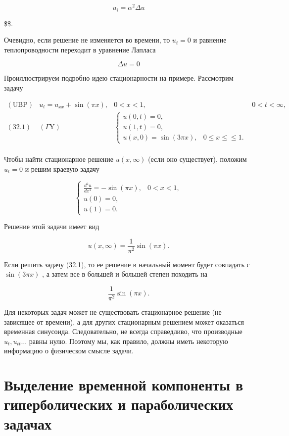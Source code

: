 \documentclass[
  ukrainian,
]{article}
\begin{document}
\[
u_i = \alpha^2 \Delta u
\]

\$\$.

Очевидно, если решение не изменяется во времени, то \(u_t = 0\) и
равнение теплопроводности переходит в уравнение Лапласа

\[
\Delta u = 0
\]

Проиллюстрируем подробно идею стационарности на примере. Рассмотрим
задачу

\[
\begin{array}{ll} (\text{UBP}) & u_t = u_{xx} + \sin{(\pi x)}, & 0 < x < 1, & 0 < t < \infty, \\ (32.1) & (\Gamma \text{Y}) & \begin{cases} u(0, t) = 0, \\ u(1, t) = 0, \\ u(x, 0) = \sin{(3\pi x)}, & 0 \le x \le \le 1. \end{cases} \\ \end{array}
\]

Чтобы найти стационарное решение \(u\left(x,\infty\right)\) (если оно
существует), положим \(u_{t}\!=\!0\) и решим краевую задачу

\[
\begin{cases} \frac{d^{2}u}{dx^{2}} = -\sin(\pi x), & 0 < x < 1, \\ u(0) = 0, \\ u(1) = 0. \end{cases}
\]

Решение этой задачи имеет вид

\[
u(x, \infty) = \frac{1}{\pi^2} \sin{(\pi x)}.
\]

Если решить задачу (32.1), то ее решение в начальный момент будет
совпадать с \(\sin{(3\pi x)}\) , а затем все в большей и большей степен
походить на

\[
\frac{1}{\pi^2}\sin{(\pi x)}.
\]

Для некоторых задач может не существовать стационарное решение (не
зависящее от времени), а для других стационарным решением может
оказаться временная синусоида. Следовательно, не всегда справедливо, что
производные \(u_t, u_{tt} \dots\) равны нулю. Поэтому мы, как правило,
должны иметь некоторую информацию о физическом смысле задачи.

\section{Выделение временной компоненты в гиперболических и
параболических
задачах}\label{ux432ux44bux434ux435ux43bux435ux43dux438ux435-ux432ux440ux435ux43cux435ux43dux43dux43eux439-ux43aux43eux43cux43fux43eux43dux435ux43dux442ux44b-ux432-ux433ux438ux43fux435ux440ux431ux43eux43bux438ux447ux435ux441ux43aux438ux445-ux438-ux43fux430ux440ux430ux431ux43eux43bux438ux447ux435ux441ux43aux438ux445-ux437ux430ux434ux430ux447ux430ux445}
\end{document}
